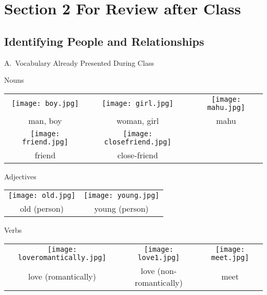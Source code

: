 \documentclass{tufte-book}
\begin{document}
\newpage
\section{Section 2 For Review after Class}
\subsection{Identifying People and Relationships}

\noindent A.~Vocabulary Already Presented During Class

\vspace{0.25cm}\noindent Nouns

\begin{table*}[h!]
\begin{tabular}{c c c}
\texttt{[image: boy.jpg]}&\texttt{[image: girl.jpg]}&\texttt{[image: mahu.jpg]}\\
\footnotesize man, boy & \footnotesize woman, girl & \footnotesize mahu\\
\texttt{[image: friend.jpg]}&\texttt{[image: closefriend.jpg]}&\\
\footnotesize friend & \footnotesize close-friend &\\

\end{tabular}
\end{table*}

\vspace{0.25cm}\noindent Adjectives

\begin{table*}[h!]
\begin{tabular}{c c}
\texttt{[image: old.jpg]}&\texttt{[image: young.jpg]}\\
\footnotesize old (person) & \footnotesize young (person) \\
\end{tabular}
\end{table*}

\vspace{0.25cm}\noindent Verbs

\begin{table*}[h!]
\begin{tabular}{c c c}
\texttt{[image: loveromantically.jpg]}&\texttt{[image: love1.jpg]}&\texttt{[image: meet.jpg]}\\
\footnotesize love (romantically) & \footnotesize love (non-romantically) & \footnotesize meet\\

\end{tabular}
\end{table*}
\end{document}
